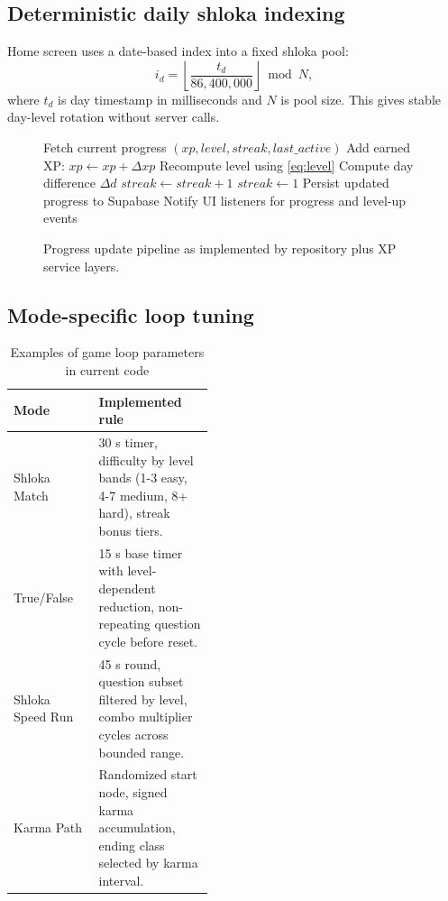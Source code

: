 \documentclass[conference]{IEEEtran}
\begin{document}
\subsection{Deterministic daily shloka indexing}
Home screen uses a date-based index into a fixed shloka pool:
\begin{equation}
i_d = \left\lfloor \frac{t_d}{86{,}400{,}000} \right\rfloor \bmod N,
\label{eq:dailyindex}
\end{equation}
where $t_d$ is day timestamp in milliseconds and $N$ is pool size. This gives stable day-level rotation without server calls.

\begin{figure}[t]
\centering
\begin{minipage}{0.47\textwidth}
\footnotesize
\begin{algorithmic}[1]
\STATE Fetch current progress $(xp, level, streak, last\_active)$
\STATE Add earned XP: $xp \leftarrow xp + \Delta xp$
\STATE Recompute level using \eqref{eq:level}
\STATE Compute day difference $\Delta d$
  \STATE $streak \leftarrow streak + 1$
  \STATE $streak \leftarrow 1$
\ENDIF
\STATE Persist updated progress to Supabase
\STATE Notify UI listeners for progress and level-up events
\end{algorithmic}
\end{minipage}
\caption{Progress update pipeline as implemented by repository plus XP service layers.}
\label{fig:progressalgo}
\end{figure}

\subsection{Mode-specific loop tuning}
\begin{table}[t]
\caption{Examples of game loop parameters in current code}
\label{tab:gameparams}
\centering
\footnotesize
\begin{tabular}{|p{0.18\linewidth}|p{0.26\linewidth}|}
\hline
\textbf{Mode} & \textbf{Implemented rule} \\
\hline
Shloka Match & 30 s timer, difficulty by level bands (1-3 easy, 4-7 medium, 8+ hard), streak bonus tiers. \\
\hline
True/False & 15 s base timer with level-dependent reduction, non-repeating question cycle before reset. \\
\hline
Shloka Speed Run & 45 s round, question subset filtered by level, combo multiplier cycles across bounded range. \\
\hline
Karma Path & Randomized start node, signed karma accumulation, ending class selected by karma interval. \\
\hline
\end{tabular}
\end{table}
\end{document}
